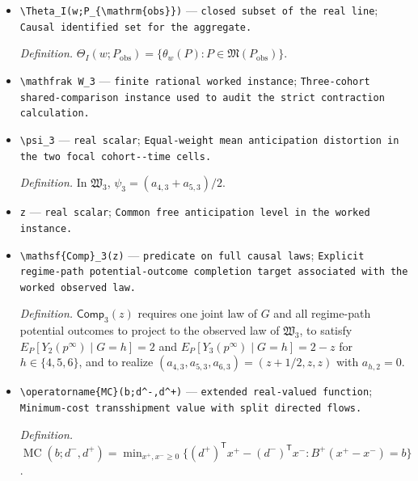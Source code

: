 \documentclass{article}
\begin{document}
\begin{itemize}
  \par\smallskip\noindent\emph{Definition.} \(\theta_w=\sum_{j\in\mathcal J}w_j\theta_j\).
  \item \texttt{\textbackslash{}\allowbreak{}Theta\_\allowbreak{}I(w;\allowbreak{}P\_\allowbreak{}\{\textbackslash{}\allowbreak{}mathrm\{obs\}\allowbreak{}\}\allowbreak{})} --- \texttt{closed subset of the real line}; \texttt{Causal identified set for the aggregate.}
  \par\smallskip\noindent\emph{Definition.} \(\Theta_I(w;P_{\mathrm{obs}})=\{\theta_w(P):P\in\mathfrak M(P_{\mathrm{obs}})\}\).
  \item \texttt{\textbackslash{}\allowbreak{}mathfrak W\_\allowbreak{}3} --- \texttt{finite rational worked instance}; \texttt{Three-\allowbreak{}cohort shared-\allowbreak{}comparison instance used to audit the strict contraction calculation.}
  \item \texttt{\textbackslash{}\allowbreak{}psi\_\allowbreak{}3} --- \texttt{real scalar}; \texttt{Equal-\allowbreak{}weight mean anticipation distortion in the two focal cohort-\allowbreak{}-\allowbreak{}time cells.}
  \par\smallskip\noindent\emph{Definition.} In \(\mathfrak W_3\), \(\psi_3=(a_{4,3}+a_{5,3})/2\).
  \item \texttt{z} --- \texttt{real scalar}; \texttt{Common free anticipation level in the worked instance.}
  \item \texttt{\textbackslash{}\allowbreak{}mathsf\{Comp\}\allowbreak{}\_\allowbreak{}3(z)} --- \texttt{predicate on full causal laws}; \texttt{Explicit regime-\allowbreak{}path potential-\allowbreak{}outcome completion target associated with the worked observed law.}
  \par\smallskip\noindent\emph{Definition.} \(\mathsf{Comp}_3(z)\) requires one joint law of \(G\) and all regime-path potential outcomes to project to the observed law of \(\mathfrak W_3\), to satisfy \(E_P[Y_2(p^\infty)\mid G=h]=2\) and \(E_P[Y_3(p^\infty)\mid G=h]=2-z\) for \(h\in\{4,5,6\}\), and to realize \((a_{4,3},a_{5,3},a_{6,3})=(z+1/2,z,z)\) with \(a_{h,2}=0\).
  \item \texttt{\textbackslash{}\allowbreak{}operatorname\{MC\}\allowbreak{}(b;\allowbreak{}d\textasciicircum{}-\allowbreak{},\allowbreak{}d\textasciicircum{}+\allowbreak{})} --- \texttt{extended real-\allowbreak{}valued function}; \texttt{Minimum-\allowbreak{}cost transshipment value with split directed flows.}
  \par\smallskip\noindent\emph{Definition.} \(\operatorname{MC}(b;d^-,d^+)=\min_{x^+,x^-\ge0}\{(d^+)^{\mathsf T}x^+-(d^-)^{\mathsf T}x^-:B^+(x^+-x^-)=b\}\).

\end{itemize}
\end{document}
